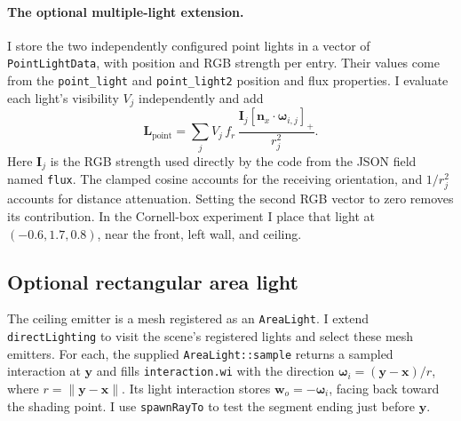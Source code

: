 \documentclass[acmtog]{acmart}
\begin{document}
\paragraph{The optional multiple-light extension.}
I store the two independently configured point lights in a vector of \texttt{PointLightData}, with position and RGB strength per entry. Their values come from the \texttt{point\_light} and \texttt{point\_light2} position and flux properties. I evaluate each light's visibility $V_j$ independently and add
\begin{equation}
\mathbf L_{\mathrm{point}}=
\sum_j V_j\, f_r\,
\frac{\mathbf I_j [\mathbf n_x\cdot\boldsymbol\omega_{i,j}]_+}{r_j^2}.
\end{equation}
Here $\mathbf I_j$ is the RGB strength used directly by the code from the JSON field named \texttt{flux}. The clamped cosine accounts for the receiving orientation, and $1/r_j^2$ accounts for distance attenuation. Setting the second RGB vector to zero removes its contribution. In the Cornell-box experiment I place that light at $(-0.6,1.7,0.8)$, near the front, left wall, and ceiling.

\subsection{Optional rectangular area light}
The ceiling emitter is a mesh registered as an \texttt{AreaLight}. I extend \texttt{directLighting} to visit the scene's registered lights and select these mesh emitters. For each, the supplied \texttt{AreaLight::sample} returns a sampled interaction at $\mathbf y$ and fills \texttt{interaction.wi} with the direction $\boldsymbol\omega_i=(\mathbf y-\mathbf x)/r$, where $r=\|\mathbf y-\mathbf x\|$. Its light interaction stores $\mathbf w_o=-\boldsymbol\omega_i$, facing back toward the shading point. I use \texttt{spawnRayTo} to test the segment ending just before $\mathbf y$.
\end{document}
